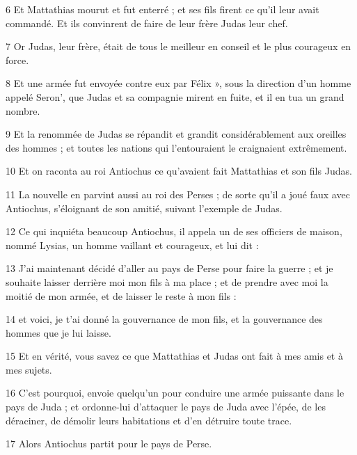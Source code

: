 \par 6 Et Mattathias mourut et fut enterré ; et ses fils firent ce qu'il leur avait commandé. Et ils convinrent de faire de leur frère Judas leur chef.

\par 7 Or Judas, leur frère, était de tous le meilleur en conseil et le plus courageux en force.

\par 8 Et une armée fut envoyée contre eux par Félix », sous la direction d'un homme appelé Seron', que Judas et sa compagnie mirent en fuite, et il en tua un grand nombre.

\par 9 Et la renommée de Judas se répandit et grandit considérablement aux oreilles des hommes ; et toutes les nations qui l'entouraient le craignaient extrêmement.

\par 10 Et on raconta au roi Antiochus ce qu'avaient fait Mattathias et son fils Judas.

\par 11 La nouvelle en parvint aussi au roi des Perses ; de sorte qu'il a joué faux avec Antiochus, s'éloignant de son amitié, suivant l'exemple de Judas.

\par 12 Ce qui inquiéta beaucoup Antiochus, il appela un de ses officiers de maison, nommé Lysias, un homme vaillant et courageux, et lui dit :

\par 13 J'ai maintenant décidé d'aller au pays de Perse pour faire la guerre ; et je souhaite laisser derrière moi mon fils à ma place ; et de prendre avec moi la moitié de mon armée, et de laisser le reste à mon fils :

\par 14 et voici, je t'ai donné la gouvernance de mon fils, et la gouvernance des hommes que je lui laisse.

\par 15 Et en vérité, vous savez ce que Mattathias et Judas ont fait à mes amis et à mes sujets.

\par 16 C'est pourquoi, envoie quelqu'un pour conduire une armée puissante dans le pays de Juda ; et ordonne-lui d'attaquer le pays de Juda avec l'épée, de les déraciner, de démolir leurs habitations et d'en détruire toute trace.

\par 17 Alors Antiochus partit pour le pays de Perse.

